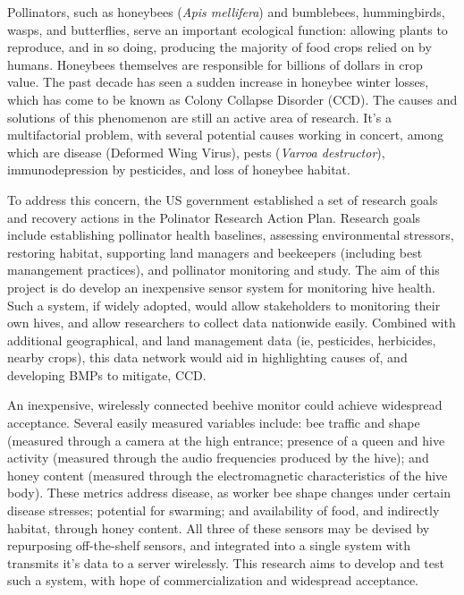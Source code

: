 


Pollinators, such as honeybees (\textit{Apis mellifera}) and bumblebees, hummingbirds, wasps, and butterflies, serve an important ecological function: allowing plants to reproduce, and in so doing, producing the majority of food crops relied on by humans. Honeybees themselves are responsible for billions of dollars in crop value. The past decade has seen a sudden increase in honeybee winter losses, which has come to be known as Colony Collapse Disorder (CCD). The causes and solutions of this phenomenon are still an active area of research. It's a multifactorial problem, with several potential causes working in concert, among which are disease (Deformed Wing Virus), pests (\textit{Varroa destructor}), immunodepression by pesticides, and loss of honeybee habitat.

To address this concern, the US government established a set of research goals and recovery actions in the Polinator Research Action Plan. Research goals include establishing pollinator health baselines, assessing environmental stressors, restoring habitat, supporting land managers and beekeepers (including best manangement practices), and pollinator monitoring and study. The aim of this project is do develop an inexpensive sensor system for monitoring hive health. Such a system, if widely adopted, would allow stakeholders to monitoring their own hives, and allow researchers to collect data nationwide easily. Combined with additional geographical, and land management data (ie, pesticides, herbicides, nearby crops), this data network would aid in highlighting causes of, and developing BMPs to mitigate, CCD.

An inexpensive, wirelessly connected beehive monitor could achieve widespread acceptance. Several easily measured variables include: bee traffic and shape (measured through a camera at the high entrance; presence of a queen and hive activity (measured through the audio frequencies produced by the hive); and honey content (measured through the electromagnetic characteristics of the hive body). These metrics address disease, as worker bee shape changes under certain disease stresses; potential for swarming; and availability of food, and indirectly habitat, through honey content. All three of these sensors may be devised by repurposing off-the-shelf sensors, and integrated into a single system with transmits it's data to a server wirelessly. This research aims to develop and test such a system, with hope of commercialization and widespread acceptance.
